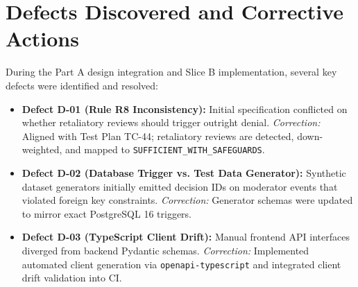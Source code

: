 \section{Defects Discovered and Corrective Actions}
During the Part A design integration and Slice B implementation, several key defects were identified and resolved:
\begin{itemize}
    \item \textbf{Defect D-01 (Rule R8 Inconsistency):} Initial specification conflicted on whether retaliatory reviews should trigger outright denial. \textit{Correction:} Aligned with Test Plan TC-44; retaliatory reviews are detected, down-weighted, and mapped to \texttt{SUFFICIENT\_WITH\_SAFEGUARDS}.
    \item \textbf{Defect D-02 (Database Trigger vs. Test Data Generator):} Synthetic dataset generators initially emitted decision IDs on moderator events that violated foreign key constraints. \textit{Correction:} Generator schemas were updated to mirror exact PostgreSQL 16 triggers.
    \item \textbf{Defect D-03 (TypeScript Client Drift):} Manual frontend API interfaces diverged from backend Pydantic schemas. \textit{Correction:} Implemented automated client generation via \texttt{openapi-typescript} and integrated client drift validation into CI.
\end{itemize}

